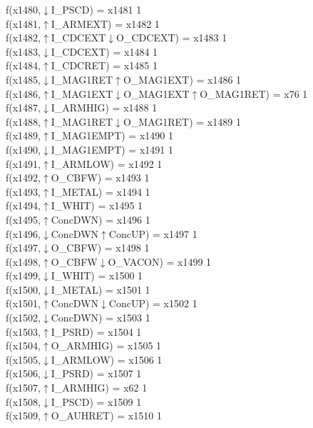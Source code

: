f(x1480,$\downarrow$I\_PSCD) = x1481 {1} \\
f(x1481,$\uparrow$I\_ARMEXT) = x1482 {1} \\
f(x1482,$\uparrow$I\_CDCEXT$\downarrow$O\_CDCEXT) = x1483 {1} \\
f(x1483,$\downarrow$I\_CDCEXT) = x1484 {1} \\
f(x1484,$\uparrow$I\_CDCRET) = x1485 {1} \\
f(x1485,$\downarrow$I\_MAG1RET$\uparrow$O\_MAG1EXT) = x1486 {1} \\
f(x1486,$\uparrow$I\_MAG1EXT$\downarrow$O\_MAG1EXT$\uparrow$O\_MAG1RET) = x76 {1} \\
f(x1487,$\downarrow$I\_ARMHIG) = x1488 {1} \\
f(x1488,$\uparrow$I\_MAG1RET$\downarrow$O\_MAG1RET) = x1489 {1} \\
f(x1489,$\uparrow$I\_MAG1EMPT) = x1490 {1} \\
f(x1490,$\downarrow$I\_MAG1EMPT) = x1491 {1} \\
f(x1491,$\uparrow$I\_ARMLOW) = x1492 {1} \\
f(x1492,$\uparrow$O\_CBFW) = x1493 {1} \\
f(x1493,$\uparrow$I\_METAL) = x1494 {1} \\
f(x1494,$\uparrow$I\_WHIT) = x1495 {1} \\
f(x1495,$\uparrow$ConcDWN) = x1496 {1} \\
f(x1496,$\downarrow$ConcDWN$\uparrow$ConcUP) = x1497 {1} \\
f(x1497,$\downarrow$O\_CBFW) = x1498 {1} \\
f(x1498,$\uparrow$O\_CBFW$\downarrow$O\_VACON) = x1499 {1} \\
f(x1499,$\downarrow$I\_WHIT) = x1500 {1} \\
f(x1500,$\downarrow$I\_METAL) = x1501 {1} \\
f(x1501,$\uparrow$ConcDWN$\downarrow$ConcUP) = x1502 {1} \\
f(x1502,$\downarrow$ConcDWN) = x1503 {1} \\
f(x1503,$\uparrow$I\_PSRD) = x1504 {1} \\
f(x1504,$\uparrow$O\_ARMHIG) = x1505 {1} \\
f(x1505,$\downarrow$I\_ARMLOW) = x1506 {1} \\
f(x1506,$\downarrow$I\_PSRD) = x1507 {1} \\
f(x1507,$\uparrow$I\_ARMHIG) = x62 {1} \\
f(x1508,$\downarrow$I\_PSCD) = x1509 {1} \\
f(x1509,$\uparrow$O\_AUHRET) = x1510 {1} \\
